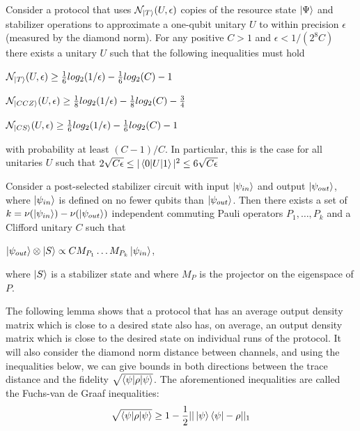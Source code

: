 \documentclass[12pt]{dalthesis}
\begin{document}
\begin{theorem}
\label{Sec5mainTheorem}
Consider a protocol  that uses $\mathcal{N}_{\ket{T}}(U, \epsilon)$ copies of the resource state $\ket{\Psi}$ and stabilizer operations to approximate a one-qubit  unitary $U$ to within precision $\epsilon$ (measured by the diamond norm). For any positive $C>1$ and $\epsilon < 1/(2^8C)$ there exists a unitary $U$ such that the following inequalities must hold
\begin{center}
$\mathcal{N}_{\ket{T}}(U, \epsilon) \geq \frac{1}{6}log_2(1/\epsilon) - \frac{1}{6}log_2(C) - 1$
\end{center}
\begin{center}
$\mathcal{N}_{\ket{CCZ}}(U, \epsilon) \geq \frac{1}{8}log_2(1/\epsilon) - \frac{1}{8}log_2(C) - \frac{3}{4}$
\end{center}
\begin{center}
$\mathcal{N}_{\ket{CS}}(U, \epsilon) \geq \frac{1}{6}log_2(1/\epsilon) - \frac{1}{6}log_2(C) - 1$
\end{center}
with probability at least $(C-1)/C$. In particular, this is the case for all unitaries $U$ such that $2\sqrt{C \epsilon} \leq |\braket{0|U|1}|^2 \leq 6\sqrt{C \epsilon}$
\end{theorem}

\begin{theorem}
Consider a post-selected stabilizer circuit with input $\ket{\psi_{in}}$ and output $\ket{\psi_{out}}$, where $\ket{\psi_{in}}$ is defined on no fewer qubits than $\ket{\psi_{out}}$. Then there exists a set of $k = \nu (\ket{\psi_{in}})-\nu (\ket{\psi_{out}})$ independent commuting Pauli operators $P_1, \dots , P_k$ and a Clifford unitary $C$ such that 
\begin{center}
$\ket{\psi_{out}} \otimes \ket{S} \propto CM_{P_1} \dots M_{P_k} \ket{\psi_{in}}$,
\end{center}
where $\ket{S}$ is a stabilizer state and where $M_P$ is the projector on the eigenspace of $P$.
\end{theorem}

The following lemma shows that a protocol that has an average output density matrix which is close to a desired state also has, on average, an output density matrix which is close to the desired state on individual runs of the protocol. It will also consider the diamond norm distance between channels, and using the inequalities below, we can give bounds in both directions between the trace distance and the fidelity $\sqrt{\braket{\psi | \rho | \psi}}$. The aforementioned inequalities are called the Fuchs-van de Graaf inequalities:
\begin{equation}
\sqrt{\braket{\psi | \rho | \psi}} \geq 1 -\frac{1}{2}||\ket{\psi} \bra{\psi} - \rho ||_1
\end{equation}
\end{document}
